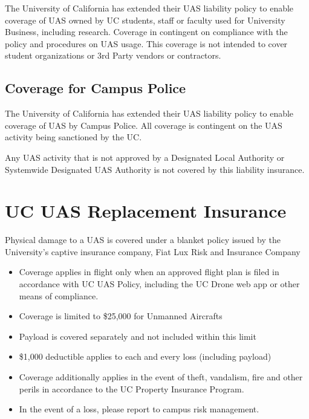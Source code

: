 \documentclass[
]{book}
\providecommand{\tightlist}{%
  \setlength{\itemsep}{0pt}\setlength{\parskip}{0pt}}
\begin{document}
The University of California has extended their UAS liability policy to enable coverage of UAS owned by UC students, staff or faculty used for University Business, including research. Coverage in contingent on compliance with the policy and procedures on UAS usage. This coverage is not intended to cover student organizations or 3rd Party vendors or contractors.

\hypertarget{ss-campus-police-coverage}{%
\section{Coverage for Campus Police}\label{ss-campus-police-coverage}}

The University of California has extended their UAS liability policy to enable coverage of UAS by Campus Police. All coverage is contingent on the UAS activity being sanctioned by the UC.

Any UAS activity that is not approved by a Designated Local Authority or Systemwide Designated UAS Authority is not covered by this liability insurance.

\hypertarget{ch-hull-insurance}{%
\chapter{UC UAS Replacement Insurance}\label{ch-hull-insurance}}

Physical damage to a UAS is covered under a blanket policy issued by the University's captive insurance company, Fiat Lux Risk and Insurance Company

\begin{itemize}
\tightlist
\item
  Coverage applies in flight only when an approved flight plan is filed in accordance with UC UAS Policy, including the UC Drone web app or other means of compliance.\\
\item
  Coverage is limited to \$25,000 for Unmanned Aircrafts
\item
  Payload is covered separately and not included within this limit
\item
  \$1,000 deductible applies to each and every loss (including payload)
\item
  Coverage additionally applies in the event of theft, vandalism, fire and other perils in accordance to the UC Property Insurance Program.
\item
  In the event of a loss, please report to campus risk management.
\end{itemize}
\end{document}
